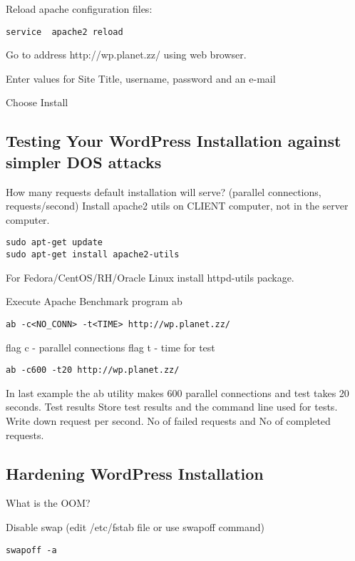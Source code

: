 Reload apache configuration files:
\begin{verbatim}
service  apache2 reload
\end{verbatim}

Go to address http://wp.planet.zz/ using web browser.

Enter values for  Site Title, username, password and an e-mail

Choose Install

\subsection{Testing Your WordPress Installation against simpler DOS attacks}


How many requests default installation will serve? (parallel connections, requests/second)
Install apache2 utils on CLIENT computer, not in the server computer.

\begin{verbatim}
sudo apt-get update
sudo apt-get install apache2-utils
\end{verbatim}

For Fedora/CentOS/RH/Oracle Linux install httpd-utils package.

Execute Apache Benchmark program ab
\begin{verbatim}
ab -c<NO_CONN> -t<TIME> http://wp.planet.zz/
\end{verbatim}
flag c - parallel connections
flag t - time for test

\begin{verbatim}
ab -c600 -t20 http://wp.planet.zz/
\end{verbatim}

In last example the ab utility makes 600 parallel connections and test takes 20 seconds.
Test results
Store test results and the command line used for tests.
Write down request per second. No of failed requests and No of completed requests.

\subsection{Hardening WordPress Installation}

What is the OOM?

Disable swap (edit /etc/fstab file or use swapoff command)


\begin{verbatim}
swapoff -a
\end{verbatim}

